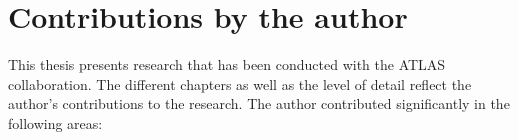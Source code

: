 


\section*{Contributions by the author}
This thesis presents research that has been conducted with the ATLAS collaboration.
The different chapters as well as the level of detail reflect the author's contributions to the research.
The author contributed significantly in the following areas:

